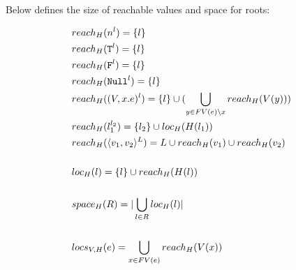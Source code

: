 \documentclass[11pt]{article}
\newcommand{\irl}[1]{\mathtt{#1}}
\begin{document}
Below defines the size of reachable values and space for roots:

\begin{align*}
  &reach_{H}(n^l) = \{l\}\\
  &reach_{H}(\irl{T}^l) = \{l\}\\
  &reach_{H}(\irl{F}^l) = \{l\}\\
  &reach_{H}(\irl{Null}^l) = \{l\}\\
  &reach_{H}((V, x.e)^l) = \{l\} \cup (\bigcup\limits_{y \in FV(e) \setminus x} reach_H(V(y))) \\
  &reach_{H}(l_1^{l_2}) = \{l_2\} \cup loc_{H}(H(l_1))\\
  &reach_{H}(\pairexcst{v_1}{v_2}^L) = L \cup reach_{H}(v_1) \cup reach_{H}(v_2)\\\\
  &loc_{H}(l) = \{l\} \cup reach_{H}(H(l))\\\\
  &space_{H}(R) = |\bigcup\limits_{l \in R} loc_{H}(l)|\\\\
  &locs_{V,H}(e) = \bigcup\limits_{x \in FV(e)} reach_H(V(x))
\end{align*}
\end{document}
